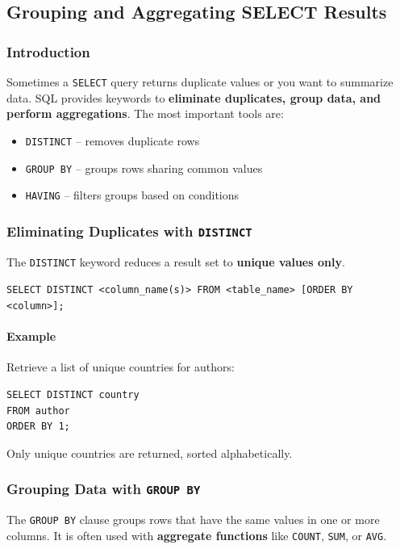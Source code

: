 \documentclass{article}
\begin{document}
\subsection{Grouping and Aggregating SELECT Results}

\subsubsection{Introduction}
Sometimes a \texttt{SELECT} query returns duplicate values or you want to summarize data.  
SQL provides keywords to \textbf{eliminate duplicates, group data, and perform aggregations}.  
The most important tools are:
\begin{itemize}
    \item \texttt{DISTINCT} – removes duplicate rows
    \item \texttt{GROUP BY} – groups rows sharing common values
    \item \texttt{HAVING} – filters groups based on conditions
\end{itemize}

\subsubsection{Eliminating Duplicates with \texttt{DISTINCT}}
The \texttt{DISTINCT} keyword reduces a result set to \textbf{unique values only}.

\begin{FormulaBox}
\texttt{SELECT DISTINCT <column\_name(s)> FROM <table\_name> [ORDER BY <column>];}
\end{FormulaBox}

\paragraph{Example}
Retrieve a list of unique countries for authors:
\begin{verbatim}
SELECT DISTINCT country
FROM author
ORDER BY 1;
\end{verbatim}
Only unique countries are returned, sorted alphabetically.

\subsubsection{Grouping Data with \texttt{GROUP BY}}
The \texttt{GROUP BY} clause groups rows that have the same values in one or more columns.  
It is often used with \textbf{aggregate functions} like \texttt{COUNT}, \texttt{SUM}, or \texttt{AVG}.
\end{document}
